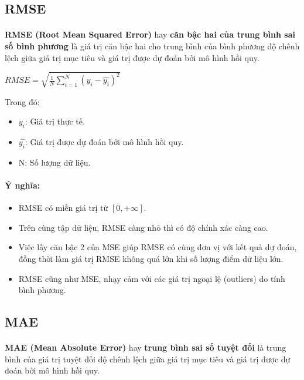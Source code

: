 \subsection{RMSE}
\paragraph{}{\textbf{RMSE (Root Mean Squared Error)} hay \textbf{căn bậc hai của trung bình sai số bình phương} là giá trị căn bậc hai cho trung bình của bình phương độ chênh lệch giữa giá trị mục tiêu và giá trị được dự đoán bởi mô hình hồi quy.}

\begin{center}
\large $RMSE = \sqrt{\frac{1}{N}\sum_{i=1}^{N}(y_{i}-\hat{y_{i}})^2}$
\end{center}

Trong đó:
\begin{itemize}
    \item $y_{i}$: Giá trị thực tế.
    \item $\hat{y_{i}}$: Giá trị được dự đoán bởi mô hình hồi quy.
    \item N: Số lượng dữ liệu.
\end{itemize}

\paragraph{Ý nghĩa:}{}
\begin{itemize}
\item RMSE có miền giá trị từ $[0,+\infty ]$. 
\item Trên cùng tập dữ liệu, RMSE càng nhỏ thì có độ chính xác càng cao. 
\item Việc lấy căn bậc 2 của MSE giúp RMSE có cùng đơn vị với kết quả dự đoán, đồng thời làm giá trị RMSE không quá lớn khi số lượng điểm dữ liệu lớn.
\item RMSE cũng như MSE, nhạy cảm với các giá trị ngoại lệ (outliers) do tính bình phương.
\end{itemize}

\subsection{MAE}

\paragraph{}{\textbf{MAE (Mean Absolute Error)} hay \textbf{trung bình sai số tuyệt đối} là trung bình của giá trị tuyệt đối độ chênh lệch giữa giá trị mục tiêu và giá trị được dự đoán bởi mô hình hồi quy.}

